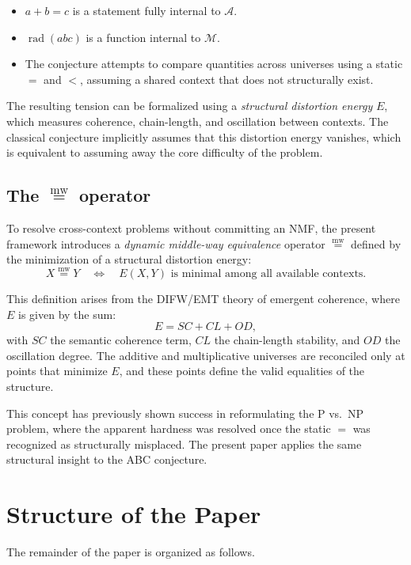 \documentclass[11pt]{article}
\newcommand{\mweq}{\mathrel{\overset{\mathrm{mw}}{=}}}
\theoremstyle{definition}
\theoremstyle{remark}
\begin{document}
\begin{itemize}
  \item $a + b = c$ is a statement fully internal to $\mathcal{A}$.
  \item $\operatorname{rad}(abc)$ is a function internal to $\mathcal{M}$.
  \item The conjecture attempts to compare quantities across universes
        using a static $=$ and $<$, assuming a shared context that does
        not structurally exist.
\end{itemize}

The resulting tension can be formalized using a {\em structural
distortion energy} $E$, which measures coherence, chain-length, and
oscillation between contexts. The classical conjecture implicitly
assumes that this distortion energy vanishes, which is equivalent to
assuming away the core difficulty of the problem.

\subsection{The $\mweq$ operator}

To resolve cross-context problems without committing an NMF, the present
framework introduces a {\em dynamic middle-way equivalence} operator
$\mweq$ defined by the minimization of a structural distortion energy:
\[
  X \mweq Y
  \quad\Longleftrightarrow\quad
  E(X,Y) \text{ is minimal among all available contexts.}
\]

This definition arises from the DIFW/EMT theory of emergent coherence,
where $E$ is given by the sum:
\[
  E = SC + CL + OD,
\]
with $SC$ the semantic coherence term, $CL$ the chain-length stability,
and $OD$ the oscillation degree. The additive and multiplicative
universes are reconciled only at points that minimize $E$, and these
points define the valid equalities of the structure.

This concept has previously shown success in reformulating the P vs.\ NP
problem, where the apparent hardness was resolved once the static $=$
was recognized as structurally misplaced. The present paper applies the
same structural insight to the ABC conjecture.

\section{Structure of the Paper}

The remainder of the paper is organized as follows.
\end{document}
